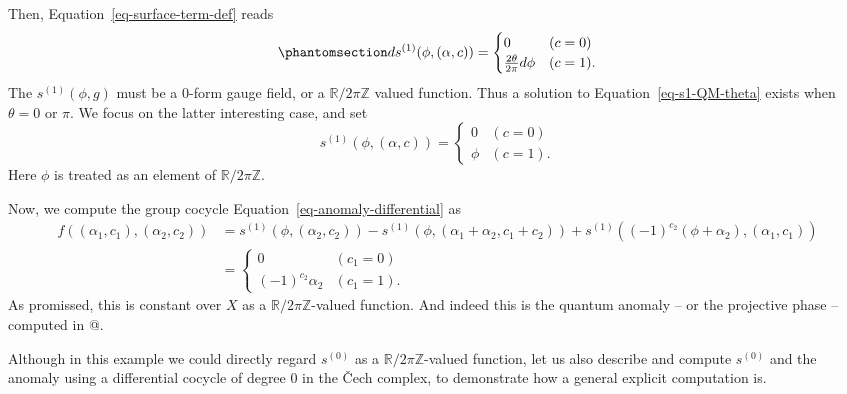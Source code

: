 \documentclass[
  letterpaper,
  DIV=11,
  numbers=noendperiod]{scrreport}
\begin{document}
Then, Equation~\ref{eq-surface-term-def} reads
\begin{equation}\phantomsection\label{eq-s1-QM-theta}{
ds^{(1)}(\phi,(\alpha,c)) = 
\begin{cases}
    0 & (c=0) \\
    \frac{2\theta}{2\pi} d\phi & (c=1).
\end{cases}
}\end{equation} The \(s^{(1)}(\phi,g)\) must be a 0-form gauge field, or
a \(\mathbb{R}/2\pi\mathbb{Z}\) valued function. Thus a solution to
Equation~\ref{eq-s1-QM-theta} exists when \(\theta = 0\) or \(\pi\). We
focus on the latter interesting case, and set \[
s^{(1)}(\phi,(\alpha,c)) =
\begin{cases}
    0 & (c=0) \\
    \phi & (c=1).
\end{cases}
\] Here \(\phi\) is treated as an element of
\(\mathbb{R}/2\pi\mathbb{Z}\).

Now, we compute the group cocycle Equation~\ref{eq-anomaly-differential}
as \[
\begin{aligned}
f((\alpha_1,c_1),(\alpha_2,c_2))
&= s^{(1)}(\phi,(\alpha_2,c_2))-s^{(1)}(\phi,(\alpha_1+\alpha_2,c_1+c_2)) + s^{(1)}((-1)^{c_2}(\phi+\alpha_2),(\alpha_1,c_1))\\
&= 
\begin{cases}
0 & (c_1=0)\\
(-1)^{c_2}\alpha_2 & (c_1=1).
\end{cases}
\end{aligned}
\] As promissed, this is constant over \(X\) as a
\(\mathbb{R}/2\pi\mathbb{Z}\)-valued function. And indeed this is the
quantum anomaly -- or the projective phase -- computed in
@\autocite[Appendix D.1]{Gaiotto:2017yup}.

Although in this example we could directly regard \(s^{(0)}\) as a
\(\mathbb{R}/2\pi\mathbb{Z}\)-valued function, let us also describe and
compute \(s^{(0)}\) and the anomaly using a differential cocycle of
degree 0 in the Čech complex, to demonstrate how a general explicit
computation is.
\end{document}
